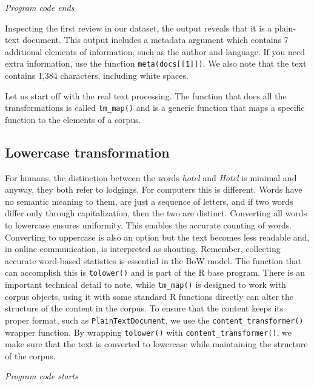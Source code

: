 \emph{Program code ends}

Inspecting the first review in our dataset, the output reveals that
it is a plain-text document. This output includes a metadata argument
which contains 7 additional elements of information, such as the author and
language. If you need extra information, use the function
\texttt{meta(docs{[}{[}1{]}{]})}. We also note that the text contains
1,384 characters, including white spaces.

Let us start off with the real text processing. The function that does
all the transformations is called \texttt{tm\_map()} and is a generic
function that maps a specific function to the elements of a corpus.

\subsection{Lowercase transformation}\label{lowercase-transformation}

For humans, the distinction between the words \emph{hotel} and
\emph{Hotel} is minimal and anyway, they both refer to lodgings. For computers this is different. Words have no semantic
meaning to them, are just a sequence of letters, and if two words
differ only through capitalization, then the two are distinct. Converting all words to lowercase ensures uniformity. This
enables the accurate counting of words. Converting to uppercase is also an
option but the text becomes less readable and, in online communication,
is interpreted as shouting. Remember, collecting accurate word-based
statistics is essential in the BoW model. The function that can
accomplish this is \texttt{tolower()} and is part of the R base program.
There is an important technical detail to note, while \texttt{tm\_map()}
is designed to work with corpus objects, using it with some standard R
functions directly can alter the structure of the content in the corpus.
To ensure that the content keeps its proper format, such as
\texttt{PlainTextDocument}, we use the \texttt{content\_transformer()}
wrapper function. By wrapping \texttt{tolower()} with
\texttt{content\_transformer()}, we make sure that the text is converted
to lowercase while maintaining the structure of the corpus.

\emph{Program code starts}

\begin{Shaded}
\begin{Highlighting}[]
\OtherTok{\textless{}{-}} 

\NormalTok{(docs[[}\NormalTok{]])}
\end{Highlighting}
\end{Shaded}

